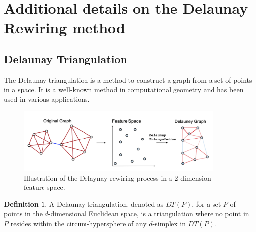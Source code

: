 \documentclass{article}
\theoremstyle{plain}
\theoremstyle{definition}
\newtheorem{definition}[theorem]{Definition}
\theoremstyle{remark}
\begin{document}
\newpage
\appendix
\onecolumn


\section{Additional details on the Delaunay Rewiring method}
\subsection{Delaunay Triangulation}
The Delaunay triangulation is a method to construct a graph from a set of points in a space.
It is a well-known method in computational geometry and has been used in various applications.

\label{app:delaunay}
\begin{figure}[h!]
    \center

    \includegraphics[width=0.9\textwidth]{figures/delaunay_process.png}
    \caption{Illustration of the Delaynay rewiring process in a 2-dimension feature space.}
    \label{fig:delaunay_full}
\end{figure}
\begin{definition}
    \label{def:delaunay}
A Delaunay triangulation, denoted as $DT(P)$, for a set $P$ of points 
        in the $d$-dimensional Euclidean space, is a triangulation where no 
        point in $P$ resides within the circum-hypersphere of any $d$-simplex 
        in $DT(P)$.
    \end{definition}

\end{document}
